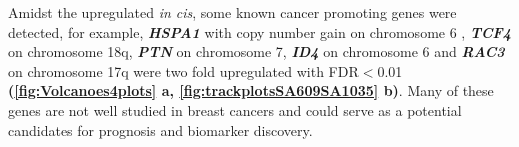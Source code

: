 Amidst the upregulated \textit{in cis}, some known cancer promoting genes were detected, for example, \textit{\textbf{HSPA1}} \cite{zoppino2018comprehensive} with copy number gain on chromosome 6 , \textit{\textbf{TCF4}} \cite{ravindranath2011wnt} on chromosome 18q, %
\textit{\textbf{PTN}} \cite{huang2018chemotherapy} on chromosome 7,        
\textit{\textbf{ID4}} \cite{donzelli2018expression} on chromosome 6 and  
\textit{\textbf{RAC3}} \cite{donnelly2017rac3} on chromosome 17q were two fold upregulated with FDR$<$0.01 \textbf{(\autoref{fig:Volcanoes4plots} a, \autoref{fig:trackplotsSA609SA1035} b)}. Many of these genes are not well studied in breast cancers and could serve as a potential candidates for prognosis and biomarker discovery.


